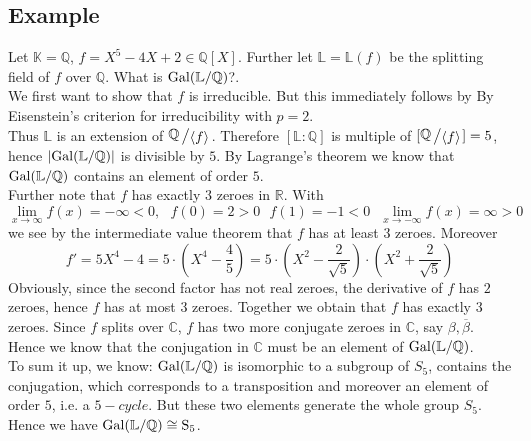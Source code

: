 \documentclass[12pt]{book}
\newcommand{\slant}[2]{{\raisebox{.1em}{$#1$}\left/\raisebox{-.1em}{$#2$}\right.}}
\begin{document}
\begin{spacing}{1.3}
\subsection{Example} %
Let $\mathbb{K}=\mathbb{Q}$, $f= X^5-4X+2 \in \mathbb{Q}[X]$. Further let $\mathbb{L}=\mathbb{L}(f)$ be the splitting field of $f$ over $\mathbb{Q}$. What is $\rm{Gal}(\mathbb{L}/\mathbb{Q})$?.\\
We first want to show that $f$ is irreducible. But this immediately follows by By Eisenstein's criterion for irreducibility with $p=2$.\\
Thus $\mathbb{L}$ is an extension of $\slant{\mathbb{Q}}{\langle f \rangle}$. Therefore $[\mathbb{L}:\mathbb{Q}]$ is multiple of $[\slant{\mathbb{Q}}{\langle f \rangle}]=5$, hence $\vert \rm{Gal}(\mathbb{L}/\mathbb{Q}) \vert$ is divisible by $5$. By Lagrange's theorem we know that $\rm{Gal}(\mathbb{L}/\mathbb{Q})$ contains an element of order $5$.\\
Further note that $f$ has exactly $3$ zeroes in $\mathbb{R}$.
With $$\lim_{x \to \infty} f(x)=- \infty <0, \textrm{ }f(0)=2>0 \textrm{ }f(1)=-1<0 \textrm{ }\lim_{x \to - \infty} f(x)= \infty >0$$ we see by the intermediate value theorem that $f$ has at least $3$ zeroes.
Moreover $$f'=5X^4-4=5\cdot \left(X^4-\frac{4}{5}\right)=5 \cdot \left(X^2- \frac{2}{\sqrt{5}}\right) \cdot \left(X^2+ \frac{2}{\sqrt{5}}\right)$$Obviously, since the second factor has not real zeroes, the derivative of $f$ has $2$ zeroes, hence $f$ has at most $3$ zeroes. Together we obtain that $f$ has exactly $3$ zeroes. Since $f$ splits over $\mathbb{C}$, $f$ has two more conjugate zeroes in $\mathbb{C}$, say $\beta, \overline{\beta}$. Hence we know that the conjugation in $\mathbb{C}$ must be an element of $\rm{Gal}(\mathbb{L}/\mathbb{Q})$.\\
To sum it up, we know: $\rm{Gal}(\mathbb{L}/\mathbb{Q})$ is isomorphic to a subgroup of $S_5$, contains the conjugation, which corresponds to a transposition and moreover an element of order $5$, i.e. a $5-cycle$. But these two elements generate the whole group $S_5$. Hence we have
$\rm{Gal}(\mathbb{L}/\mathbb{Q}) \cong S_5$.


\end{spacing}
\end{document}
